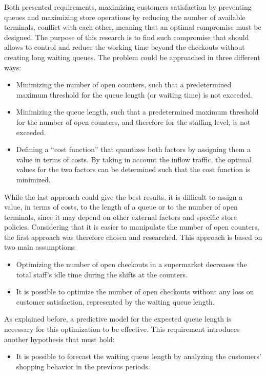 Both presented requirements, maximizing customers satisfaction by preventing queues and maximizing store operations by reducing the number of available terminals, conflict with each other, meaning that an optimal compromise must be designed. The purpose of this research is to find such compromise that should allows to control and reduce the working time beyond the checkouts without creating long waiting queues. The problem could be approached in three different ways:
\begin{itemize}
  \item Minimizing the number of open counters, such that a predetermined maximum threshold for the queue length (or waiting time) is not exceeded.
  \item Minimizing the queue length, such that a predetermined maximum threshold for the number of open counters, and therefore for the staffing level, is not exceeded.
  \item Defining a “cost function” that quantizes both factors by assigning them a value in terms of costs. By taking in account the inflow traffic, the optimal values for the two factors can be determined such that the cost function is minimized.
\end{itemize}

While the last approach could give the best results, it is difficult to assign a value, in terms of costs, to the length of a queue or to the number of open terminals, since it may depend on other external factors and specific store policies. Considering that it is easier to manipulate the number of open counters, the first approach was therefore chosen and researched. This approach is based on two main assumptions:
\begin{itemize}
  \item Optimizing the number of open checkouts in a supermarket decreases the total staff’s idle time during the shifts at the counters.
  \item It is possible to optimize the number of open checkouts without any loss on customer satisfaction, represented by the waiting queue length.
\end{itemize}

As explained before, a predictive model for the expected queue length is necessary for this optimization to be effective. This requirement introduces another hypothesis that must hold:
\begin{itemize}
  \item It is possible to forecast the waiting queue length by analyzing the customers’ shopping behavior in the previous periods.
\end{itemize}


